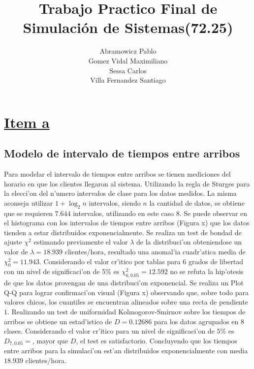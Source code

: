 \documentclass[a4paper,10pt]{article}
\title{Trabajo Practico Final de Simulaci\'on de Sistemas(72.25)}
\author{
Abramowicz Pablo\\
Gomez Vidal Maximiliano\\
Sessa Carlos\\
Villa Fernandez Santiago\\
}
\begin{document}
\maketitle

\section*{\underline{Item a}}
\subsection{Modelo de intervalo de tiempos entre arribos}
Para modelar el intervalo de tiempos entre arribos se tienen mediciones del horario en que los clientes llegaron al sistema. Utilizando la regla de Sturges para la elecci'on del n'umero intervalos de clase para los datos medidos. La misma aconseja utilizar $1 + \log_2 n$ intervalos, siendo $n$ la cantidad de datos, se obtiene que se requieren $7.644$ intervalos, utilizando en este caso $8$. Se puede observar en el histograma con los intervalos de tiempos entre arribos (Figura x) que los datos tienden a estar distribuidos exponencialmente. Se realiza un test de bondad de ajuste $\chi^2$ estimando previamente el valor $\lambda$ de la distribuci'on obteniendose un valor de $\lambda = 18.939$ clientes/hora, resultado una anomal'ia cuadr'atica media de $\chi_0^2 = 11.943$. Considerando el valor cr'itico por tablas para $6$ grados de libertad con un nivel de significaci'on de 5\% es $\chi_{6,0.05}^2 = 12.592$ no se refuta la hip'otesis de que los datos provengan de una distribuci'on exponencial. Se realiza un Plot Q-Q para lograr confirmaci'on visual (Figura x) observando que, sobre todo para valores chicos, los cuantiles se encuentran alineados sobre una recta de pendiente $1$. Realizando un test de uniformidad Kolmogorov-Smirnov sobre los tiempos de arribos se obtiene un estad'istico de $D =  0.12686$ para los datos agrupados en $8$ clases. Considerando el valor cr'itico para un nivel de significaci'on de $5\%$ es $D_{7, 0.05} = $, mayor que $D$, el test es satisfactorio. Concluyendo que los tiempos entre arribos para la simulaci'on est'an distribuidos exponencialmente con media $18.939$ clientes/hora.
\end{document}
